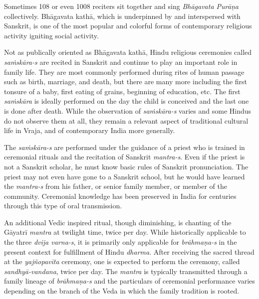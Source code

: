 Sometimes 108 or even 1008 reciters sit together and sing {\sl Bhāgavata Purāṇa} collectively. Bhāgavata kathā, which is underpinned by and interspersed with Sanskrit, is one of the most popular and colorful forms of contemporary religious activity igniting social activity. 

Not as publically oriented as Bhāgavata kathā, Hindu religious ceremonies called {\sl saṁskāra-s} are recited in Sanskrit and continue to play an important role in family life. They are most commonly performed during rites of human passage such as birth, marriage, and death, but there are many more including the first tonsure of a baby, first eating of grains, beginning of education, etc. The first {\sl saṁskāra} is ideally performed on the day the child is conceived and the last one is done after death. While the observation of {\sl saṁskāra-s} varies and some Hindus do not observe them at all, they remain a relevant aspect of traditional cultural life in Vraja, and of contemporary India more generally.

The {\sl saṁskāra-s} are performed under the guidance of a priest who is trained in ceremonial rituals and the recitation of Sanskrit {\sl mantra-s}. Even if the priest is not a Sanskrit scholar, he must know basic rules of Sanskrit pronunciation. The priest may not even have gone to a Sanskrit school, but he would have learned the {\sl mantra-s} from his father, or senior family member, or member of the community. Ceremonial knowledge has been preserved in India for centuries through this type of oral transmission. 

An additional Vedic inspired ritual, though diminishing, is chanting of the Gāyatrī {\sl mantra} at twilight time, twice per day. While historically applicable to the three {\sl dvija varna-s}, it is primarily only applicable for {\sl brāhmaṇa-s} in the present context for fulfillment of Hindu {\sl dharma}. After receiving the sacred thread at the {\sl yajñopavīta} ceremony, one is expected to perform the ceremony, called {\sl sandhyā-vandana}, twice per day. The {\sl mantra} is typically transmitted through a family lineage of {\sl brāhmaṇa-s} and the particulars of ceremonial performance varies depending on the branch of the  Veda in which the family tradition is rooted. 

